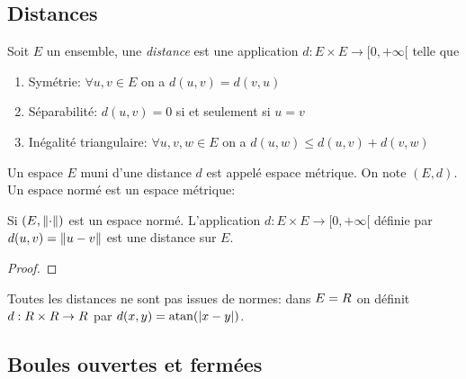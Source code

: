         \sld{\vfill\pagebreak[5]}%
        \subsection{Distances}

        \begin{definition}
            Soit $E$ un ensemble, une \emph{distance} est une application $d:E\times E \to [0,+\infty[$ telle que 
                    \begin{enumerate}
                        \item Symétrie: $\forall u,v \in E$ on a $d(u,v) = d(v,u)$
                        \item Séparabilité: $d(u,v) = 0$ si et seulement si $u=v$
                        \item Inégalité triangulaire: $\forall u,v,w\in E$ on a $d(u,w) \leq  d(u,v) + d(v,w)$
                    \end{enumerate}
                \end{definition}
                Un espace $E$ muni d'une distance $d$ est appelé espace métrique. On note $(E,d)$. Un espace normé est un espace métrique:

                \begin{proposition}
                    Si $(E,\left\lVert\cdot\right\rVert)$ est un espace normé. L'application $d:E\times E \to [0,+\infty[$ définie par $d(u,v) = \left\lVert u-v\right\rVert$ est une distance sur $E$.
                        \end{proposition}
                        \begin{proof}
                            \pl{\rep{5cm}}
                        \end{proof}

                        \begin{remark}
                            Toutes les distances ne sont pas issues de normes: dans $E=R$ on définit $d:R\times R \to R$ par $d(x,y) = \operatorname{atan}(\left\lvert x-y\right\rvert)$. %
                            \pl{\rep{5cm}}
                        \end{remark}


                        \sld{\vfill\pagebreak[5]}%
                        \subsection{Boules ouvertes et fermées}

